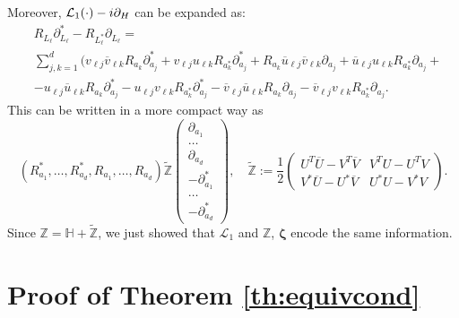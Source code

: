 \documentclass[preprint]{elsarticle}
\theoremstyle{definition}
\def\LL{\mathcal{L}}
\begin{document}
Moreover, ${\cal L}_1(\cdot)-i\partial_H$ can be expanded as:
\[\begin{split}&R_{L_\ell}\partial_{L_\ell}^*-R_{L^*_\ell}\partial_{L_\ell}=\\
&\sum_{j,k=1}^{d}(v_{\ell j}\overline{v}_{\ell k} R_{a_k}\partial_{a_j}^*+v_{\ell j}u_{\ell k} R_{a^*_k}\partial_{a_j}^*+R_{a_k}\overline{u}_{\ell j}\overline{v}_{\ell k} \partial_{a_j}+\overline{u}_{\ell j}u_{\ell k} R_{a^*_k}\partial_{a_j}+\\
&-u_{\ell j}\overline{u}_{\ell k} R_{a_k}\partial_{a_j}^*-u_{\ell j}v_{\ell k} R_{a^*_k}\partial_{a_j}^*-\overline{v}_{\ell j}\overline{u}_{\ell k} R_{a_k}\partial_{a_j}-\overline{v}_{\ell j}v_{\ell k} R_{a^*_k}\partial_{a_j}.\end{split}\]
This can be written in a more compact way as
$$(R^*_{a_1},\dots,R^*_{a_d},R_{a_1}, \dots, R_{a_d}) \widetilde{\mathbb{Z}}\begin{pmatrix} \partial_{a_1}\\ \dots\\ \partial_{a_d}\\-\partial^*_{a_1}\\ \dots\\ -\partial^*_{a_d}\end{pmatrix}, \quad \widetilde{\mathbb{Z}}:=\frac{1}{2}\begin{pmatrix} U^T\overline{U}-V^T\overline{V} & V^TU-U^T V\\
V^*\overline{U}-U^*\overline{V} & U^*U-V^*V\end{pmatrix}.$$
Since $\mathbb{Z}=\mathbb{H}+\widetilde{\mathbb{Z}}$, we just showed that $\LL_1$ and $\mathbb{Z}$, $\boldsymbol{\zeta}$ encode the same information.


\section{Proof of Theorem \ref{th:equivcond}} \label{app:C}
\end{document}
